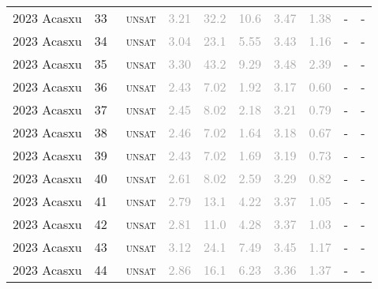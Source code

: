 \begin{center}
{\begin{longtable}{@{}llllllllll@{}}
2023 Acasxu & 33 & ~\textsc{unsat} & \textcolor{darkgray}{3.21} & \textcolor{darkgray}{32.2} & \textcolor{darkgray}{10.6} & \textcolor{darkgray}{3.47} & \textcolor{darkgray}{1.38} & - & - \\
2023 Acasxu & 34 & ~\textsc{unsat} & \textcolor{darkgray}{3.04} & \textcolor{darkgray}{23.1} & \textcolor{darkgray}{5.55} & \textcolor{darkgray}{3.43} & \textcolor{darkgray}{1.16} & - & - \\
2023 Acasxu & 35 & ~\textsc{unsat} & \textcolor{darkgray}{3.30} & \textcolor{darkgray}{43.2} & \textcolor{darkgray}{9.29} & \textcolor{darkgray}{3.48} & \textcolor{darkgray}{2.39} & - & - \\
2023 Acasxu & 36 & ~\textsc{unsat} & \textcolor{darkgray}{2.43} & \textcolor{darkgray}{7.02} & \textcolor{darkgray}{1.92} & \textcolor{darkgray}{3.17} & \textcolor{darkgray}{0.60} & - & - \\
2023 Acasxu & 37 & ~\textsc{unsat} & \textcolor{darkgray}{2.45} & \textcolor{darkgray}{8.02} & \textcolor{darkgray}{2.18} & \textcolor{darkgray}{3.21} & \textcolor{darkgray}{0.79} & - & - \\
2023 Acasxu & 38 & ~\textsc{unsat} & \textcolor{darkgray}{2.46} & \textcolor{darkgray}{7.02} & \textcolor{darkgray}{1.64} & \textcolor{darkgray}{3.18} & \textcolor{darkgray}{0.67} & - & - \\
2023 Acasxu & 39 & ~\textsc{unsat} & \textcolor{darkgray}{2.43} & \textcolor{darkgray}{7.02} & \textcolor{darkgray}{1.69} & \textcolor{darkgray}{3.19} & \textcolor{darkgray}{0.73} & - & - \\
2023 Acasxu & 40 & ~\textsc{unsat} & \textcolor{darkgray}{2.61} & \textcolor{darkgray}{8.02} & \textcolor{darkgray}{2.59} & \textcolor{darkgray}{3.29} & \textcolor{darkgray}{0.82} & - & - \\
2023 Acasxu & 41 & ~\textsc{unsat} & \textcolor{darkgray}{2.79} & \textcolor{darkgray}{13.1} & \textcolor{darkgray}{4.22} & \textcolor{darkgray}{3.37} & \textcolor{darkgray}{1.05} & - & - \\
2023 Acasxu & 42 & ~\textsc{unsat} & \textcolor{darkgray}{2.81} & \textcolor{darkgray}{11.0} & \textcolor{darkgray}{4.28} & \textcolor{darkgray}{3.37} & \textcolor{darkgray}{1.03} & - & - \\
2023 Acasxu & 43 & ~\textsc{unsat} & \textcolor{darkgray}{3.12} & \textcolor{darkgray}{24.1} & \textcolor{darkgray}{7.49} & \textcolor{darkgray}{3.45} & \textcolor{darkgray}{1.17} & - & - \\
2023 Acasxu & 44 & ~\textsc{unsat} & \textcolor{darkgray}{2.86} & \textcolor{darkgray}{16.1} & \textcolor{darkgray}{6.23} & \textcolor{darkgray}{3.36} & \textcolor{darkgray}{1.37} & - & - \\

\end{longtable}}
\end{center}
